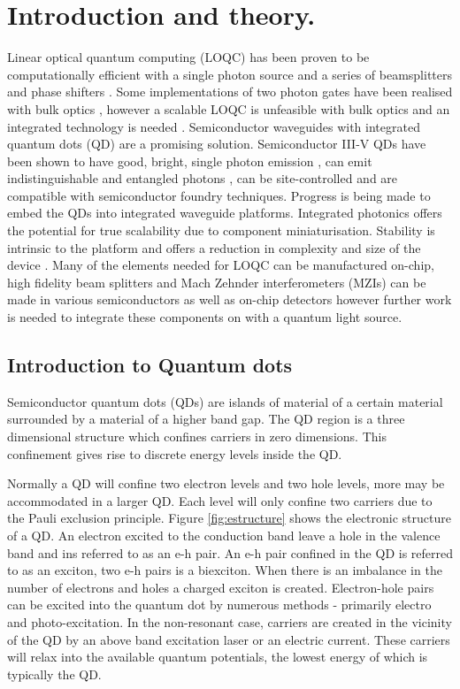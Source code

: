 
  \chapter{Introduction and theory.}

Linear optical quantum computing (LOQC) has been proven to be computationally
efficient with a single photon source and a series of beamsplitters and phase
shifters \cite{knill2001scheme}. Some implementations of two photon gates have
been realised with bulk optics \cite{o2003demonstration}, however a scalable
LOQC is unfeasible with bulk optics and an integrated technology is needed
\cite{carolan2015universal}. Semiconductor waveguides with integrated quantum
dots (QD) are a promising solution. Semiconductor III-V QDs have been shown to
have good, bright, single photon emission \cite{Bennett:05}, can emit
indistinguishable and entangled photons \cite{he2013demand,stevenson2012}, can
be site-controlled \cite{juska2013towards} and are compatible with semiconductor
foundry techniques. Progress is being made to embed the QDs into integrated
waveguide platforms. Integrated photonics offers the potential for true
scalability due to component miniaturisation. Stability is intrinsic to the
platform and offers a reduction in complexity and size of the device
\cite{politi2009integrated}. Many of the elements needed for LOQC can be
manufactured on-chip, high fidelity beam splitters and Mach Zehnder
interferometers (MZIs) can be made in various semiconductors
\cite{wang2014gallium, zhang2011, politi2008silica} as well as on-chip detectors
\cite{gerrits2011chip, hadfield2009single} however further work is needed to
integrate these components on with a quantum light source.

\section{Introduction to Quantum dots}

Semiconductor quantum dots (QDs) are islands of material of a certain material
surrounded by a material of a higher band gap. The QD region is a three
dimensional structure which confines carriers in zero dimensions. This
confinement gives rise to discrete energy levels inside the QD.

Normally a QD will confine two electron levels and two hole levels, more may be
accommodated in a larger QD. Each level will only confine two carriers due to the
Pauli exclusion principle. Figure \ref{fig:estructure} shows the electronic
structure of a QD. An electron excited to the conduction band leave a hole in
the valence band and ins referred to as an e-h pair. An e-h pair confined in the
QD is referred to as an exciton, two e-h pairs is a biexciton. When there is an
imbalance in the number of electrons and holes a charged exciton is created.
Electron-hole pairs can be excited into the quantum dot by numerous methods -
primarily electro and photo-excitation. In the non-resonant case, carriers are
created in the vicinity of the QD by an above band excitation laser or an
electric current. These carriers will relax into the available quantum
potentials, the lowest energy of which is typically the QD.

